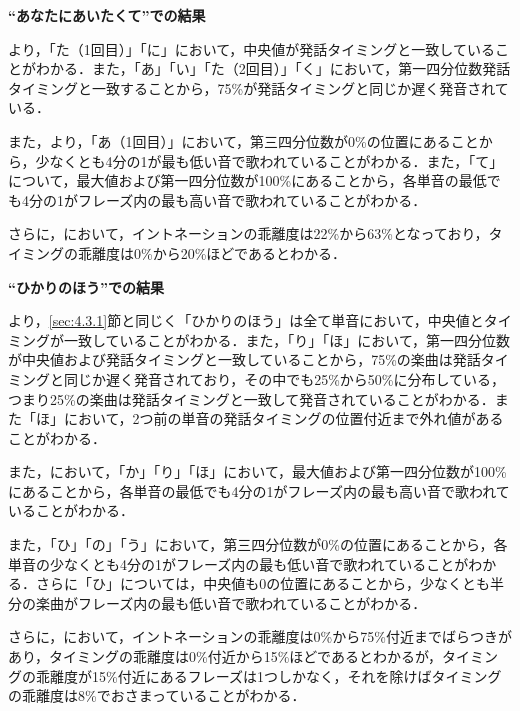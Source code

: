 \textbf{“あなたにあいたくて”での結果}\par
{}より，「た（1回目）」「に」において，中央値が発話タイミングと一致していることがわかる．また，「あ」「い」「た（2回目）」「く」において，第一四分位数発話タイミングと一致することから，75\%が発話タイミングと同じか遅く発音されている．\par
また，より，「あ（1回目）」において，第三四分位数が0\%の位置にあることから，少なくとも4分の1が最も低い音で歌われていることがわかる．また，「て」について，最大値および第一四分位数が100\%にあることから，各単音の最低でも4分の1がフレーズ内の最も高い音で歌われていることがわかる．\par
さらに，において，イントネーションの乖離度は22\%から63\%となっており，タイミングの乖離度は0\%から20\%ほどであるとわかる．


\textbf{“ひかりのほう”での結果}\par
より，\ref{sec:4.3.1}節と同じく「ひかりのほう」は全て単音において，中央値とタイミングが一致していることがわかる．また，「り」「ほ」において，第一四分位数が中央値および発話タイミングと一致していることから，75\%の楽曲は発話タイミングと同じか遅く発音されており，その中でも25\%から50\%に分布している，つまり25\%の楽曲は発話タイミングと一致して発音されていることがわかる．また「ほ」において，2つ前の単音の発話タイミングの位置付近まで外れ値があることがわかる．\par
また，において，「か」「り」「ほ」において，最大値および第一四分位数が100\%にあることから，各単音の最低でも4分の1がフレーズ内の最も高い音で歌われていることがわかる．\par
また，「ひ」「の」「う」において，第三四分位数が0\%の位置にあることから，各単音の少なくとも4分の1がフレーズ内の最も低い音で歌われていることがわかる．さらに「ひ」については，中央値も0の位置にあることから，少なくとも半分の楽曲がフレーズ内の最も低い音で歌われていることがわかる．\par
さらに，において，イントネーションの乖離度は0\%から75\%付近までばらつきがあり，タイミングの乖離度は0\%付近から15\%ほどであるとわかるが，タイミングの乖離度が15\%付近にあるフレーズは1つしかなく，それを除けばタイミングの乖離度は8\%でおさまっていることがわかる．


